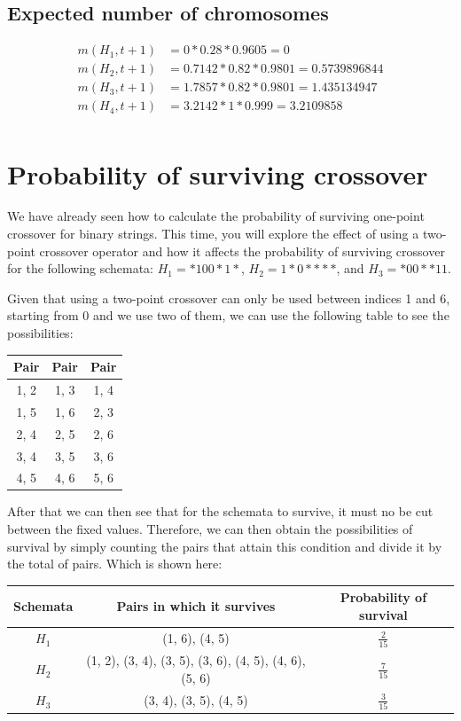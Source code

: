 \documentclass{article}
\begin{document}
\subsection*{Expected number of chromosomes}
\begin{align*}
    m(H_1,t +1) &= 0 * 0.28 * 0.9605 = 0\\
    m(H_2,t +1) &= 0.7142 * 0.82 * 0.9801 = 0.5739896844\\
    m(H_3,t +1) &= 1.7857 * 0.82 * 0.9801 = 1.435134947\\
    m(H_4,t +1) &= 3.2142 * 1 * 0.999 = 3.2109858\\
\end{align*}

\section{Probability of surviving crossover}
We have already seen how to calculate the probability of surviving one-point crossover for binary strings. This time, you will explore the effect of using a two-point crossover operator and how it affects the probability of surviving crossover for the following schemata: $H_1 = *100*1*$, $H_2 = 1*0****$, and $H_3 = *00**11$.

Given that using a two-point crossover can only be used between indices 1 and 6, starting from 0 and we use two of them, we can use the following table to see the possibilities:
\begin{table}[h]
    \centering
    \begin{tabular}{c||c||c}
       Pair &  Pair &  Pair \\
        \hline
        1, 2 & 1, 3 & 1, 4 \\
        1, 5 & 1, 6 & 2, 3 \\
        2, 4 & 2, 5 & 2, 6 \\
        3, 4 & 3, 5 & 3, 6 \\
        4, 5 & 4, 6 & 5, 6 \\
    \end{tabular}
\end{table}

After that we can then see that for the schemata to survive, it must no be cut between the fixed values. Therefore, we can then obtain the possibilities of survival by simply counting the pairs that attain this condition and divide it by the total of pairs. Which is shown here:
\begin{table}[h]
    \centering
    \begin{tabular}{c|c|c}
        Schemata & Pairs in which it survives & Probability of survival \\
        \hline
        $H_1$ & (1, 6), (4, 5) & $\frac{2}{15}$ \\
        $H_2$ & (1, 2), (3, 4), (3, 5), (3, 6), (4, 5), (4, 6), (5, 6) & $\frac{7}{15}$  \\
        $H_3$ & (3, 4), (3, 5), (4, 5) & $\frac{3}{15}$ \\
    \end{tabular}
\end{table}
\end{document}
